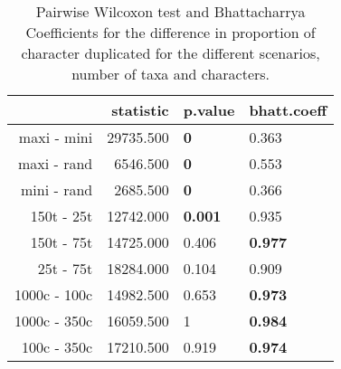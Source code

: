 \begin{table}[ht]
\centering
\begin{tabular}{rrll}
  \hline
 & statistic & p.value & bhatt.coeff \\ 
  \hline
maxi - mini & 29735.500 & \textbf{0} & 0.363 \\ 
  maxi - rand & 6546.500 & \textbf{0} & 0.553 \\ 
  mini - rand & 2685.500 & \textbf{0} & 0.366 \\ 
  150t - 25t & 12742.000 & \textbf{0.001} & 0.935 \\ 
  150t - 75t & 14725.000 & 0.406 & \textbf{0.977} \\ 
  25t - 75t & 18284.000 & 0.104 & 0.909 \\ 
  1000c - 100c & 14982.500 & 0.653 & \textbf{0.973} \\ 
  1000c - 350c & 16059.500 & 1 & \textbf{0.984} \\ 
  100c - 350c & 17210.500 & 0.919 & \textbf{0.974} \\ 
   \hline
\end{tabular}
\caption{Pairwise Wilcoxon test and Bhattacharrya Coefficients for the difference in proportion of character duplicated for the different scenarios, number of taxa and characters.} 
\label{Tab_proportion_duplicated}
\end{table}
